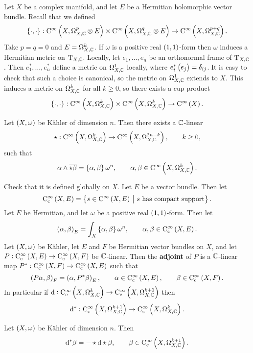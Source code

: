 Let $ X $ be a complex manifold, and let $ E $ be a Hermitian holomorphic vector bundle. Recall that we defined
$$ \cbr{\cdot, \cdot} : \C^\infty\br{X, \Omega_{X, \CC}^p \otimes E} \times \C^\infty\br{X, \Omega_{X, \CC}^q \otimes E} \to \C^\infty\br{X, \Omega_{X, \CC}^{p + q}}. $$
Take $ p = q = 0 $ and $ E = \Omega_{X, \mathbb{C}}^k $. If $ \omega $ is a positive real $ \br{1, 1} $-form then $ \omega $ induces a Hermitian metric on $ \mathrm{T}_{X, \mathbb{C}} $. Locally, let $ e_1, \dots, e_n $ be an orthonormal frame of $ \mathrm{T}_{X, \mathbb{C}} $. Then $ e_1^*, \dots, e_n^* $ define a metric on $ \Omega_{X, \mathbb{C}}^1 $ locally, where $ e_i^*\br{e_j} = \delta_{ij} $. It is easy to check that such a choice is canonical, so the metric on $ \Omega_{X, \mathbb{C}}^1 $ extends to $ X $. This induces a metric on $ \Omega_{X, \mathbb{C}}^k $ for all $ k \ge 0 $, so there exists a cup product
$$ \cbr{\cdot, \cdot} : \C^\infty\br{X, \Omega_{X, \CC}^k} \times \C^\infty\br{X, \Omega_{X, \CC}^k} \to \C^\infty\br{X}. $$

\begin{lemma}
Let $ \br{X, \omega} $ be K\"ahler of dimension $ n $. Then there exists a $ \mathbb{C} $-linear
$$ \star : \C^\infty\br{X, \Omega_{X, \CC}^k} \to \C^\infty\br{X, \Omega_{X, \CC}^{2n - k}}, \qquad k \ge 0, $$
such that
$$ \alpha \wedge \overline{\star\beta} = \cbr{\alpha, \beta}\omega^n, \qquad \alpha, \beta \in \C^\infty\br{X, \Omega_{X, \CC}^k}. $$
\end{lemma}

Check that it is defined globally on $ X $. Let $ E $ be a vector bundle. Then let
$$ \C_\c^\infty\br{X, E} = \cbr{s \in \C^\infty\br{X, E} \st s \ \text{has compact support}}. $$
Let $ E $ be Hermitian, and let $ \omega $ be a positive real $ \br{1, 1} $-form. Then let
$$ \br{\alpha, \beta}_E = \int_X \cbr{\alpha, \beta}\omega^n, \qquad \alpha, \beta \in \C_\c^\infty\br{X, E}. $$
Let $ \br{X, \omega} $ be K\"ahler, let $ E $ and $ F $ be Hermitian vector bundles on $ X $, and let $ P : \C_\c^\infty\br{X, E} \to \C_\c^\infty\br{X, F} $ be $ \mathbb{C} $-linear. Then the \textbf{adjoint} of $ P $ is a $ \mathbb{C} $-linear map $ P^* : \C_\c^\infty\br{X, F} \to \C_\c^\infty\br{X, E} $ such that
$$ \br{P\alpha, \beta}_F = \br{\alpha, P^*\beta}_E, \qquad \alpha \in \C_\c^\infty\br{X, E}, \qquad \beta \in \C_\c^\infty\br{X, F}. $$
In particular if $ \d : \C_\c^\infty\br{X, \Omega_{X, \CC}^k} \to \C_\c^\infty\br{X, \Omega_{X, \CC}^{k + 1}} $ then
$$ \d^* : \C_\c^\infty\br{X, \Omega_{X, \CC}^{k + 1}} \to \C_\c^\infty\br{X, \Omega_{X, \CC}^k}. $$

\begin{lemma}
\label{lem:6.11}
Let $ \br{X, \omega} $ be K\"ahler of dimension $ n $. Then
$$ \d^*\beta = -\star\d\star\beta, \qquad \beta \in \C_\c^\infty\br{X, \Omega_{X, \CC}^{k + 1}}. $$
\end{lemma}

